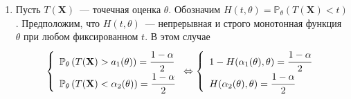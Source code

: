 \documentclass[oneside,final,14pt]{extreport}
\theoremstyle{plain}
\theoremstyle{definition}
\theoremstyle{named}
\begin{document}
\begin{enumerate}
    \item Пусть $T(\mathbf{X})$~--- точечная оценка $\theta$. Обозначим $H(t, \theta)=\mathbb{P}_{\theta}(T(\mathbf{X})<t)$. Предположим, что $H(t,\theta)$~--- непрерывная и строго монотонная функция $\theta$ при любом фиксированном $t$. В этом случае
    \begin{equation*}
        \left\{\begin{array}{l}
            \mathbb{P}_{\theta}\left(T(\mathbf{X})>a_{1}(\theta)\right)
            = \cfrac{1-\alpha}{2} \\ 
            \mathbb{P}_{\theta}\left(T(\mathbf{X})<\alpha_{2}(\theta)\right)
            = \cfrac{1-\alpha}{2}
        \end{array}\right. 
        \Leftrightarrow 
        \left\{\begin{array}{l}
            1 - H(\alpha_{1}(\theta), \theta)=\cfrac{1-\alpha}{2} \\ 
            H(\alpha_{2}(\theta), \theta)=\cfrac{1-\alpha}{2}
        \end{array}\right.
    \end{equation*}
    

\end{enumerate}
\end{document}
